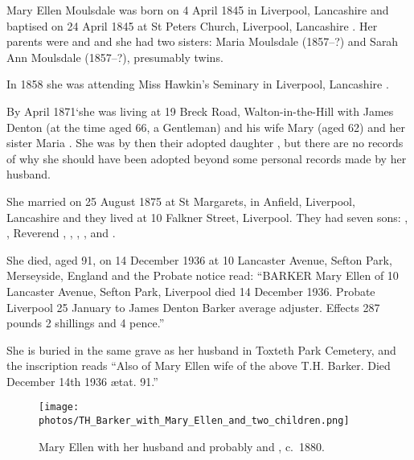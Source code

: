 
Mary Ellen Moulsdale was born on 4 April 1845 in Liverpool, Lancashire \cite{MEMoulsdaleBirth} and baptised on 24 April 1845 at St Peters Church, Liverpool, Lancashire \cite{MEMoulsdaleBaptism}. Her parents were  and  and she had two sisters: Maria Moulsdale (1857--?) and Sarah Ann Moulsdale (1857--?), presumably twins. 

In 1858 she was attending Miss Hawkin's Seminary in Liverpool, Lancashire \cite{MEMoulsdaleSchool}.

By April 1871`she was living at 19 Breck Road, Walton-in-the-Hill with James Denton (at the time aged 66, a Gentleman) and his wife Mary (aged 62) and her sister Maria \cite{MEMoulsdaleResidence}.  She was by then their adopted daughter \cite{MEMoulsdaleAdoption},  but there are no records of why she should have been adopted beyond some personal records made by her husband. 

She married  on 25 August 1875 at St Margarets, in Anfield, Liverpool, Lancashire \cite{MEMoulsdaleMarriage} and they lived at 10 Falkner Street, Liverpool.  They had seven sons: , , Reverend , , , , and .

She died, aged 91, on 14 December 1936 at 10 Lancaster Avenue, Sefton Park, Merseyside, England \cite{ToxtethBarker20} and the Probate notice read:
``BARKER Mary Ellen of 10 Lancaster Avenue, Sefton Park, Liverpool died 14 December 1936. Probate Liverpool 25 January to James Denton Barker average adjuster. Effects 287 pounds 2 shillings and 4 pence.''

She is buried in the same grave as her husband in Toxteth Park Cemetery, and the inscription reads ``Also of Mary Ellen wife of the above T.H. Barker. Died December 14th 1936 \ae{}tat. 91.''\cite{THBgrave}

\begin{figure}
 \centering
 \texttt{[image: photos/TH\_Barker\_with\_Mary\_Ellen\_and\_two\_children.png]}
 \caption{Mary Ellen with her husband and probably  and , c.~1880.}
\end{figure}
